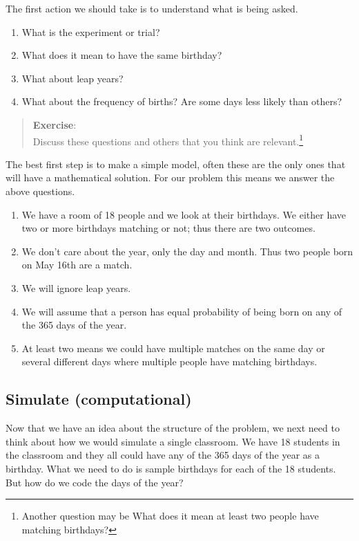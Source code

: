 \documentclass[
  letterpaper,
  DIV=11,
  numbers=noendperiod]{scrreprt}
\providecommand{\tightlist}{%
  \setlength{\itemsep}{0pt}\setlength{\parskip}{0pt}}\usepackage{longtable,booktabs,array}
\begin{document}
The first action we should take is to understand what is being asked.

\begin{enumerate}
\def\labelenumi{\arabic{enumi}.}
\tightlist
\item
  What is the experiment or trial?
\item
  What does it mean to have the same birthday?
\item
  What about leap years?
\item
  What about the frequency of births? Are some days less likely than
  others?
\end{enumerate}

\begin{quote}
\textbf{Exercise}:\\
Discuss these questions and others that you think are
relevant.\footnote{Another question may be What does it mean at least
  two people have matching birthdays?}
\end{quote}

The best first step is to make a simple model, often these are the only
ones that will have a mathematical solution. For our problem this means
we answer the above questions.

\begin{enumerate}
\def\labelenumi{\arabic{enumi}.}
\tightlist
\item
  We have a room of 18 people and we look at their birthdays. We either
  have two or more birthdays matching or not; thus there are two
  outcomes.
\item
  We don't care about the year, only the day and month. Thus two people
  born on May 16th are a match.
\item
  We will ignore leap years.
\item
  We will assume that a person has equal probability of being born on
  any of the 365 days of the year.
\item
  At least two means we could have multiple matches on the same day or
  several different days where multiple people have matching birthdays.
\end{enumerate}

\subsection{Simulate (computational)}\label{simulate-computational}

Now that we have an idea about the structure of the problem, we next
need to think about how we would simulate a single classroom. We have 18
students in the classroom and they all could have any of the 365 days of
the year as a birthday. What we need to do is sample birthdays for each
of the 18 students. But how do we code the days of the year?
\end{document}
